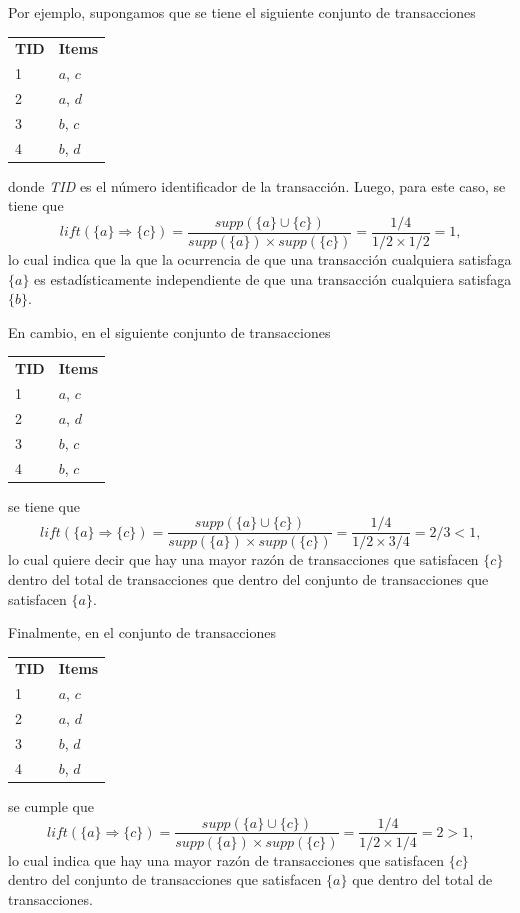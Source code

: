 Por ejemplo, supongamos que se tiene el siguiente conjunto de transacciones

\begin{tabular}{l l}
\textbf{TID} & \textbf{Items} \\
1 & $a$, $c$ \\
2 & $a$, $d$ \\
3 & $b$, $c$ \\
4 & $b$, $d$ \\
\end{tabular}

donde \textit{TID} es el número identificador de la transacción. Luego, para este caso, se tiene que $$\mathit{lift}(\{a\} \Rightarrow \{c\}) = \frac{\mathit{supp}(\{a\} \cup \{c\})}{\mathit{supp}(\{a\}) \times \mathit{supp}(\{c\})} = \frac{1/4}{1/2 \times 1/2} = 1\text{,}$$ lo cual indica que la que la ocurrencia de que una transacción cualquiera satisfaga $\{a\}$ es estadísticamente independiente de que una transacción cualquiera satisfaga $\{b\}$.

En cambio, en el siguiente conjunto de transacciones

\begin{tabular}{l l}
\textbf{TID} & \textbf{Items} \\
1 & $a$, $c$ \\
2 & $a$, $d$ \\
3 & $b$, $c$ \\
4 & $b$, $c$ \\
\end{tabular}

se tiene que $$\mathit{lift}(\{a\} \Rightarrow \{c\}) = \frac{\mathit{supp}(\{a\} \cup \{c\})}{\mathit{supp}(\{a\}) \times \mathit{supp}(\{c\})} = \frac{1/4}{1/2 \times 3/4} = 2/3 < 1\text{,}$$ lo cual quiere decir que hay una mayor razón de transacciones que satisfacen $\{c\}$ dentro del total de transacciones que dentro del conjunto de transacciones que satisfacen $\{a\}$.

Finalmente, en el conjunto de transacciones

\begin{tabular}{l l}
\textbf{TID} & \textbf{Items} \\
1 & $a$, $c$ \\
2 & $a$, $d$ \\
3 & $b$, $d$ \\
4 & $b$, $d$ \\
\end{tabular}

se cumple que $$\mathit{lift}(\{a\} \Rightarrow \{c\}) = \frac{\mathit{supp}(\{a\} \cup \{c\})}{\mathit{supp}(\{a\}) \times \mathit{supp}(\{c\})} = \frac{1/4}{1/2 \times 1/4} = 2 > 1\text{,}$$ lo cual indica que hay una mayor razón de transacciones que satisfacen $\{c\}$ dentro del conjunto de transacciones que satisfacen $\{a\}$ que dentro del total de transacciones.

